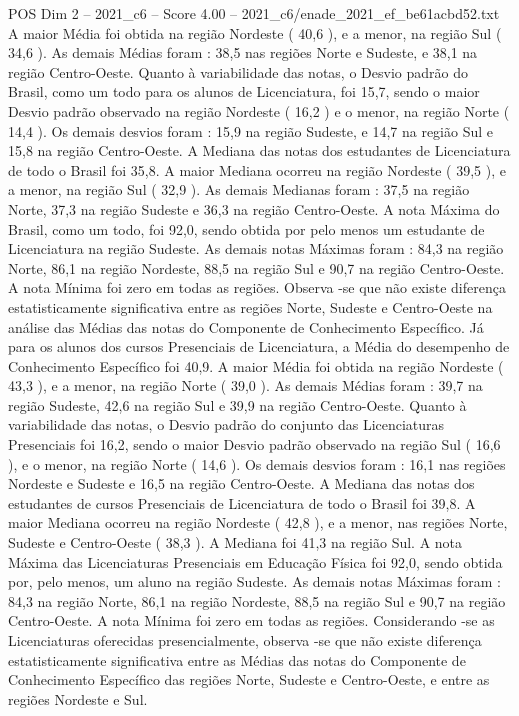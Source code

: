 \begin{textsample}{POS Dim 2 – 2021\_c6 – Score 4.00 – 2021\_c6/enade\_2021\_ef\_be61acbd52.txt}
A maior Média foi obtida na região Nordeste ( 40,6 ), e a menor, na região Sul ( 34,6 ).
As demais Médias foram : 38,5 nas regiões Norte e Sudeste, e 38,1 na região Centro-Oeste.
Quanto à variabilidade das notas, o Desvio padrão do Brasil, como um todo para os alunos de Licenciatura, foi 15,7, sendo o maior Desvio padrão observado na região Nordeste ( 16,2 ) e o menor, na região Norte ( 14,4 ).
Os demais desvios foram : 15,9 na região Sudeste, e 14,7 na região Sul e 15,8 na região Centro-Oeste.
A Mediana das notas dos estudantes de Licenciatura de todo o Brasil foi 35,8.
A maior Mediana ocorreu na região Nordeste ( 39,5 ), e a menor, na região Sul ( 32,9 ).
As demais Medianas foram : 37,5 na região Norte, 37,3 na região Sudeste e 36,3 na região Centro-Oeste.
A nota Máxima do Brasil, como um todo, foi 92,0, sendo obtida por pelo menos um estudante de Licenciatura na região Sudeste.
As demais notas Máximas foram : 84,3 na região Norte, 86,1 na região Nordeste, 88,5 na região Sul e 90,7 na região Centro-Oeste.
A nota Mínima foi zero em todas as regiões.
Observa -se que não existe diferença estatisticamente significativa entre as regiões Norte, Sudeste e Centro-Oeste na análise das Médias das notas do Componente de Conhecimento Específico.
Já para os alunos dos cursos Presenciais de Licenciatura, a Média do desempenho de Conhecimento Específico foi 40,9.
A maior Média foi obtida na região Nordeste ( 43,3 ), e a menor, na região Norte ( 39,0 ).
As demais Médias foram : 39,7 na região Sudeste, 42,6 na região Sul e 39,9 na região Centro-Oeste.
Quanto à variabilidade das notas, o Desvio padrão do conjunto das Licenciaturas Presenciais foi 16,2, sendo o maior Desvio padrão observado na região Sul ( 16,6 ), e o menor, na região Norte ( 14,6 ).
Os demais desvios foram : 16,1 nas regiões Nordeste e Sudeste e 16,5 na região Centro-Oeste.
A Mediana das notas dos estudantes de cursos Presenciais de Licenciatura de todo o Brasil foi 39,8.
A maior Mediana ocorreu na região Nordeste ( 42,8 ), e a menor, nas regiões Norte, Sudeste e Centro-Oeste ( 38,3 ).
A Mediana foi 41,3 na região Sul.
A nota Máxima das Licenciaturas Presenciais em Educação Física foi 92,0, sendo obtida por, pelo menos, um aluno na região Sudeste.
As demais notas Máximas foram : 84,3 na região Norte, 86,1 na região Nordeste, 88,5 na região Sul e 90,7 na região Centro-Oeste.
A nota Mínima foi zero em todas as regiões.
Considerando -se as Licenciaturas oferecidas presencialmente, observa -se que não existe diferença estatisticamente significativa entre as Médias das notas do Componente de Conhecimento Específico das regiões Norte, Sudeste e Centro-Oeste, e entre as regiões Nordeste e Sul.

\end{textsample}
